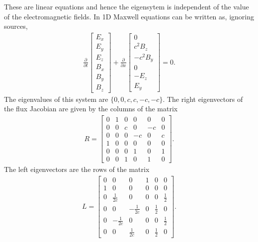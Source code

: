 \documentclass[11pt, reqno]{amsart}
\newcommand{\pfraca}[1]{\frac{\partial}{\partial #1}}
\theoremstyle{definition}
\begin{document}
These are linear equations and hence the eigensytem is independent of
the value of the electromagnetic fields. In 1D Maxwell equations can
be written as, ignoring sources,
\begin{align}
  \pfraca{t}
  \left[
    \begin{matrix}
      E_x \\
      E_y \\
      E_z \\
      B_x \\
      B_y \\
      B_z
    \end{matrix}
  \right]
  +
  \pfraca{x}
  \left[
    \begin{matrix}
      0 \\
      c^2B_z \\
      -c^2B_y \\
      0 \\
      -E_z \\
      E_y
    \end{matrix}
  \right]
  =
  0.
\end{align}
The eigenvalues of this system are $\{0,0,c,c,-c,-c\}$. The right
eigenvectors of the flux Jacobian are given by the columns of the
matrix
\begin{align}
  R
  =
  \left[
    \begin{matrix}
      0 & 1 & 0 & 0 & 0 & 0 \\
      0 & 0 & c & 0 & -c & 0 \\
      0 & 0 & 0 & -c & 0 & c \\
      1 & 0 & 0 & 0 & 0 & 0 \\
      0 & 0 & 0 & 1 & 0 & 1 \\
      0 & 0 & 1 & 0 & 1 & 0
    \end{matrix}
  \right].
  \label{eq:rev}
\end{align}
The left eigenvectors are the rows of the matrix
\begin{align}
  L
  =
  \left[
    \begin{matrix}
      0 & 0 & 0 & 1 & 0 & 0 \\
      1 & 0 & 0 & 0 & 0 & 0 \\
      0 & \frac{1}{2c} & 0 & 0 & 0 & \frac{1}{2} \\
      0 & 0 & -\frac{1}{2c} & 0 & \frac{1}{2} & 0 \\
      0 & -\frac{1}{2c} & 0 & 0 & 0 & \frac{1}{2} \\
      0 & 0 & \frac{1}{2c} & 0 & \frac{1}{2} & 0
    \end{matrix}
  \right].
  \label{eq:lev}
\end{align}
\end{document}

